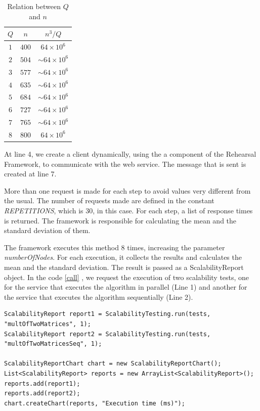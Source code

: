 \begin{table}[htdp]
\caption{Relation between $Q$ and $n$}
\begin{center}
\begin{tabular}{|c|c|c|}
\hline
$Q$ 	& $n$ 	& $n^3/Q$ \\ \hline
$1$	& $400$	& $64 \times 10^6$ \\ \hline
$2$	& $504$	& $\sim64 \times 10^6$ \\ \hline
$3$	& $577$	& $\sim64 \times 10^6$ \\ \hline
$4$	& $635$	& $\sim64 \times 10^6$ \\ \hline
$5$	& $684$	& $\sim64 \times 10^6$ \\ \hline
$6$	& $727$	& $\sim64 \times 10^6$ \\ \hline
$7$	& $765$	& $\sim64 \times 10^6$ \\ \hline
$8$	& $800$	& $64 \times 10^6$ \\ \hline

\end{tabular}
\end{center}
\label{table1}
\end{table}%

At line 4, we create a client dynamically, using the a component of the Rehearsal Framework, to communicate with the web service. The message that is sent is created at line 7. 

More than one request is made for each step to avoid values very different from the usual. The number of requests made are defined in the constant \emph{REPETITIONS}, which is 30, in this case. For each step, a list of response times is returned. The framework is responsible for calculating the mean and the standard deviation of them.

The framework executes this method 8 times, increasing the parameter \emph{numberOfNodes}. For each execution, it collects the results and calculates the mean and the standard deviation. The result is passed as a ScalabilityReport object. In the code \ref{call} , we request the execution of two scalability tests, one for the service that executes the algorithm in parallel (Line 1) and another for the service that executes the algorithm sequentially (Line 2).

\begin{lstlisting}
ScalabilityReport report1 = ScalabilityTesting.run(tests, "multOfTwoMatrices", 1);
ScalabilityReport report2 = ScalabilityTesting.run(tests, "multOfTwoMatricesSeq", 1);

ScalabilityReportChart chart = new ScalabilityReportChart();
List<ScalabilityReport> reports = new ArrayList<ScalabilityReport>();
reports.add(report1);
reports.add(report2);
chart.createChart(reports, "Execution time (ms)");
\end{lstlisting} 

